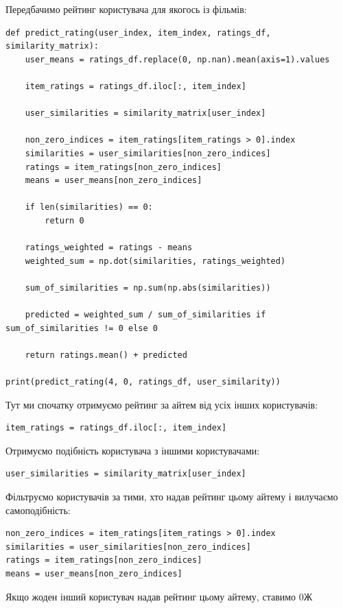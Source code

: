 Передбачимо рейтинг користувача для якогось із фільмів:


\begin{lstlisting}
def predict_rating(user_index, item_index, ratings_df, similarity_matrix):
    user_means = ratings_df.replace(0, np.nan).mean(axis=1).values

    item_ratings = ratings_df.iloc[:, item_index]
    
    user_similarities = similarity_matrix[user_index]
    
    non_zero_indices = item_ratings[item_ratings > 0].index
    similarities = user_similarities[non_zero_indices]
    ratings = item_ratings[non_zero_indices]
    means = user_means[non_zero_indices]
    
    if len(similarities) == 0:
        return 0
    
    ratings_weighted = ratings - means
    weighted_sum = np.dot(similarities, ratings_weighted)
    
    sum_of_similarities = np.sum(np.abs(similarities))

    predicted = weighted_sum / sum_of_similarities if sum_of_similarities != 0 else 0

    return ratings.mean() + predicted

print(predict_rating(4, 0, ratings_df, user_similarity))
\end{lstlisting}

Тут ми спочатку отримуємо рейтинг за айтем від усіх інших користувачів:

\begin{lstlisting}
item_ratings = ratings_df.iloc[:, item_index]
\end{lstlisting}

Отримуємо подібність користувача з іншими користувачами:

\begin{lstlisting}
user_similarities = similarity_matrix[user_index]
\end{lstlisting}

Фільтруємо користувачів за тими, хто надав рейтинг цьому айтему і вилучаємо самоподібність:

\begin{lstlisting}
non_zero_indices = item_ratings[item_ratings > 0].index
similarities = user_similarities[non_zero_indices]
ratings = item_ratings[non_zero_indices]
means = user_means[non_zero_indices]
\end{lstlisting}

Якщо жоден інший користувач надав рейтинг цьому айтему, ставимо 0Ж

